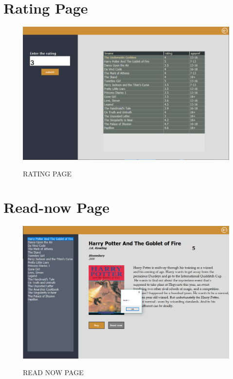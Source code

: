 \section{Rating Page}
\begin{figure}[H]
\centering
\caption{RATING PAGE}
\includegraphics[scale=.5]{./ssrating.png}
\\[0.2in]
\label{fig:insert}
\end{figure}
\thispagestyle{fancy}
\section{Read-now Page}
\begin{figure}[H]
\centering
\caption{READ NOW PAGE}
\includegraphics[scale=.5]{./ssreadnow.png}
\\[0.2in]
\label{fig:insert}
\end{figure}
\thispagestyle{fancy}
